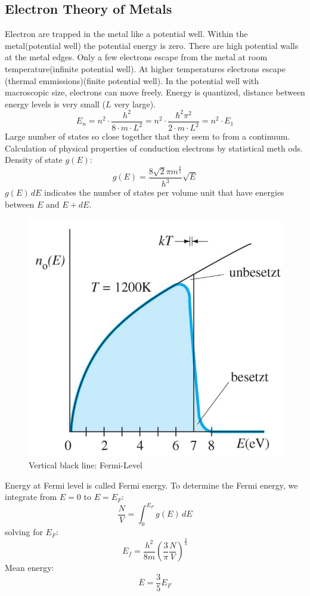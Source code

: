 \subsection{Electron Theory of Metals}
Electron are trapped in the metal like a potential well.
Within the metal(potential well) the potential energy is zero.
There are high potential walls at the metal edges.
Only a few electrons escape from the metal at room temperature(infinite potential well).
At higher temperatures electrons escape (thermal emmissions)(finite potential well).
In the potential well with macroscopic size, electrons can move freely.
Energy is quantized, distance between energy levels is very small (\(L\) very large).
\begin{equation*}
    E_n = n^2 \cdot \frac{h^2}{8 \cdot m \cdot L^2} = n^2 \cdot \frac{\hbar^2 \pi^2}{2\cdot m \cdot L^2} = n^2 \cdot E_1
\end{equation*}
Large number of states so close together that they seem to from a continuum.
Calculation of physical properties of conduction electrons by statistical meth ods.
Density of state \(g(E)\):
\begin{equation*}
    g(E) = \frac{8\sqrt{2}\pi m^{\frac{3}{2}}}{h^3}\sqrt{E}
\end{equation*}
\(g(E)\,dE\) indicates the number of states per volume unit that have energies between \(E\) and \(E + dE\).
\begin{figure}[h]
    \centering
    \includegraphics[width=0.8\columnwidth]{images/metals.png}
    \caption{Vertical black line: Fermi-Level}
    \label{fig:metals}
\end{figure}
Energy at Fermi level is called Fermi energy.
To determine the Fermi energy, we integrate from \(E = 0\) to \(E = E_F\):
\[
\frac{N}{V} = \int_{0}^{E_F}g(E)\, dE
\]
solving for \(E_F\):
\[
E_f = \frac{h^2}{8m}\left(\frac{3}{\pi}\frac{N}{V}\right)^{\frac{2}{3}}
\]
Mean energy:
\[
\overline{E} = \frac{3}{5}E_F
\]

